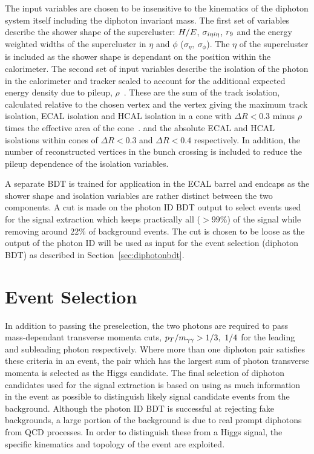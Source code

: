 The input variables are chosen to be insensitive to the kinematics of the diphoton system itself
including the diphoton invariant mass. The first set of variables describe the shower shape of the 
supercluster: $H/E$, $\sigma_{i\eta i\eta}$, $r_{9}$ and the energy weighted widths of the supercluster in
$\eta$ and $\phi$ ($\sigma_{\eta},~\sigma_{\phi}$). The $\eta$ of the supercluster is 
included as the shower shape is dependant on the position within the calorimeter. 
The second set of input variables describe the
isolation of the photon in the calorimeter and tracker scaled to account for 
the additional expected energy density due to pileup, $\rho$~\cite{2011JInst611002C}. 
These are the sum of the track isolation, 
calculated relative to the chosen vertex and the vertex giving the maximum track isolation,
ECAL isolation and HCAL isolation in a cone with $\Delta R<0.3$ minus $\rho$ times the effective area 
of the cone~\cite{2011JInst611002C}.
and the absolute ECAL and HCAL isolations within cones of $\Delta R <0.3$ and $\Delta R<0.4$ 
respectively. In addition, the number of reconstructed vertices in the bunch crossing is included
to reduce the pileup dependence of the isolation variables. 

A separate BDT is trained for application in the ECAL barrel and endcaps as the shower
shape and isolation variables are rather distinct between the two components. 
A cut is made on the photon ID BDT output to select events used for the signal extraction which
keeps practically all ($>99\%$) of the signal while removing around 22\% of background events.
The cut is chosen to be loose as the output of the photon ID will be used as input for the 
event selection (diphoton BDT) as described in Section~\ref{sec:diphotonbdt}. 

\section{Event Selection}
\label{sec:eventselection}

In addition to passing the preselection, the two photons are required to pass mass-dependant transverse 
momenta cuts, $p_{T}/m_{\gamma\gamma} > 1/3, ~1/4$ for the leading and subleading photon respectively.
Where more than one diphoton pair satisfies these criteria in an event, the pair which has the largest
sum of photon transverse momenta is selected as the Higgs candidate.
The final selection of diphoton candidates used for the signal extraction is based on using as much information 
in the event as possible to distinguish likely signal candidate events from the background. Although the 
photon ID BDT is successful at rejecting fake backgrounds, a large portion of the background is due to
real prompt diphotons from QCD processes. In order to distinguish these from a Higgs signal, 
the specific kinematics and topology of the event are exploited.

